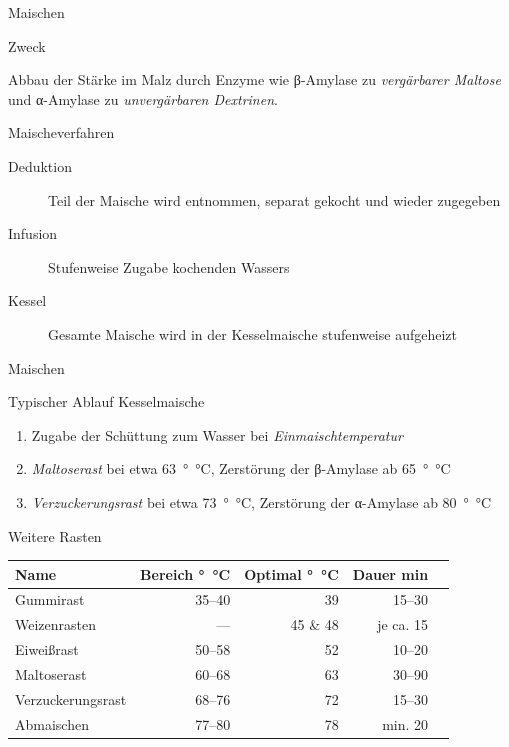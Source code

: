 \documentclass[9pt, ngerman]{beamer}
\begin{document}
\begin{frame}{Maischen}
  \begin{block}{Zweck}
    \vspace{0.5em}

    Abbau der Stärke im Malz durch Enzyme wie β-Amylase zu
    \emph{vergärbarer Maltose} und α-Amylase zu \emph{unvergärbaren
    Dextrinen}.

  \end{block}

  \begin{block}{Maischeverfahren}
    \begin{description}
      \item[Deduktion] Teil der Maische wird entnommen, separat gekocht und wieder zugegeben
      \item[Infusion] Stufenweise Zugabe kochenden Wassers
      \item[Kessel] Gesamte Maische wird in der Kesselmaische stufenweise aufgeheizt
    \end{description}
  \end{block}
\end{frame}
\begin{frame}{Maischen}
  \begin{block}{Typischer Ablauf Kesselmaische}
    \begin{enumerate}
      \item Zugabe der Schüttung zum Wasser bei \emph{Einmaischtemperatur}
      \item \emph{Maltoserast} bei etwa \SI{63}{\degree\celsius}, Zerstörung der
        β-Amylase ab \SI{65}{\degree\celsius}
      \item \emph{Verzuckerungsrast} bei etwa \SI{73}{\degree\celsius},
        Zerstörung der α-Amylase ab \SI{80}{\degree\celsius}
    \end{enumerate}
  \end{block}
  \begin{block}{Weitere Rasten}
    \vspace{-0.5em}
    \begin{table}
      \begin{tabular}{lrrrr}
        \textbf{Name} & \textbf{Bereich \si{\degree\celsius}} & \textbf{Optimal \si{\degree\celsius}} & \textbf{Dauer \si{\minute}}\\
        \midrule
        Gummirast           & \numrange{35}{40} & 39        & \numrange{15}{30}\\
        Weizenrasten        & ---               & 45 \& 48  & je ca. 15\\
        Eiweißrast          & \numrange{50}{58} & 52        & \numrange{10}{20}\\
        Maltoserast         & \numrange{60}{68} & 63        & \numrange{30}{90}\\
        Verzuckerungsrast   & \numrange{68}{76} & 72        & \numrange{15}{30}\\
        Abmaischen          & \numrange{77}{80} & 78        & min. 20\\
      \end{tabular}
    \end{table}
  \end{block}
\end{frame}
\end{document}
